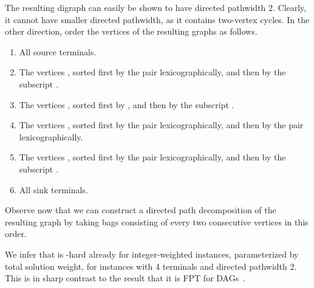 The resulting digraph can easily be shown to have directed pathwidth 2.
Clearly, it cannot have smaller directed pathwidth, as it contains two-vertex
cycles.
In the other direction, order the vertices of the resulting graphs as follows.
\begin{enumerate}
\item All source terminals.
\item The vertices , sorted first by the pair  lexicographically, and then by the subscript .
\item The vertices , sorted first by , and then by the subscript .
\item The vertices , sorted first by the pair  lexicographically, and then by the pair  lexicographically.
\item The vertices , sorted first by the pair  lexicographically, and then by the subscript .
\item All sink terminals.
\end{enumerate}
Observe now that we can 
construct a directed path decomposition of the resulting graph
by taking bags consisting of every two consecutive vertices in this order.

We infer that \dirmc{} is -hard already for integer-weighted instances,
parameterized by total solution weight, for instances with 4 terminals 
and directed pathwidth 2. This is in sharp contrast to the result
that it is FPT for DAGs~\cite{dags-alg}.
